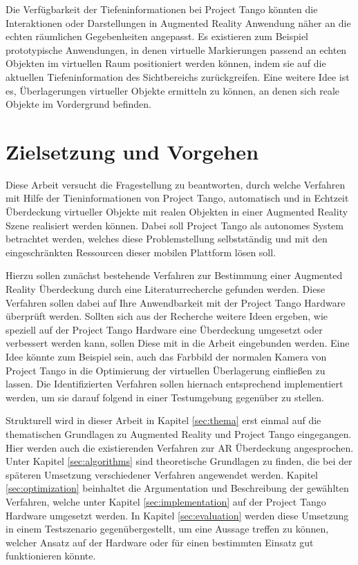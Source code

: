 Die Verfügbarkeit der Tiefeninformationen bei Project Tango könnten die Interaktionen oder Darstellungen in Augmented Reality Anwendung näher an die echten räumlichen Gegebenheiten angepasst. Es existieren zum Beispiel prototypische Anwendungen, in denen virtuelle Markierungen passend an echten Objekten im virtuellen Raum positioniert werden können, indem sie auf die aktuellen Tiefeninformation des Sichtbereichs zurückgreifen. Eine weitere Idee ist es, Überlagerungen virtueller Objekte ermitteln zu können, an denen sich reale Objekte im Vordergrund befinden.

\section{Zielsetzung und Vorgehen}

Diese Arbeit versucht die Fragestellung zu beantworten, durch welche Verfahren mit Hilfe der Tieninformationen von Project Tango, automatisch und in Echtzeit Überdeckung virtueller Objekte mit realen Objekten in einer Augmented Reality Szene realisiert werden können. Dabei soll Project Tango als autonomes System betrachtet werden, welches diese Problemstellung selbstständig und mit den eingeschränkten Ressourcen dieser mobilen Plattform lösen soll.

Hierzu sollen zunächst bestehende Verfahren zur Bestimmung einer Augmented Reality Überdeckung durch eine Literaturrecherche gefunden werden. Diese Verfahren sollen dabei auf Ihre Anwendbarkeit mit der Project Tango Hardware überprüft werden. Sollten sich aus der Recherche weitere Ideen ergeben, wie speziell auf der Project Tango Hardware eine Überdeckung umgesetzt oder verbessert werden kann, sollen Diese mit in die Arbeit eingebunden werden. Eine Idee könnte zum Beispiel sein, auch das Farbbild der normalen Kamera von Project Tango in die Optimierung der virtuellen Überlagerung einfließen zu lassen. Die Identifizierten Verfahren sollen hiernach entsprechend implementiert werden, um sie darauf folgend in einer Testumgebung gegenüber zu stellen.

Strukturell wird in dieser Arbeit in Kapitel \ref{sec:thema} erst einmal auf die thematischen Grundlagen zu Augmented Reality und Project Tango eingegangen. Hier werden auch die existierenden Verfahren zur AR Überdeckung angesprochen. Unter Kapitel \ref{sec:algorithms} sind theoretische Grundlagen zu finden, die bei der späteren Umsetzung verschiedener Verfahren angewendet werden. Kapitel \ref{sec:optimization} beinhaltet die Argumentation und Beschreibung der gewählten Verfahren, welche unter Kapitel \ref{sec:implementation} auf der Project Tango Hardware umgesetzt werden. In Kapitel \ref{sec:evaluation} werden diese Umsetzung in einem Testszenario gegenübergestellt, um eine Aussage treffen zu können, welcher Ansatz auf der Hardware oder für einen bestimmten Einsatz gut funktionieren könnte.


